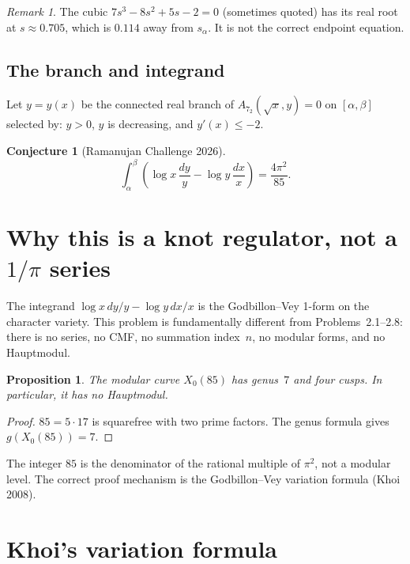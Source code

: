 \documentclass[11pt]{article}
\newtheorem{conjecture}[theorem]{Conjecture}
\newtheorem{proposition}[theorem]{Proposition}
\theoremstyle{remark}
\newtheorem{remark}[theorem]{Remark}
\begin{document}
\begin{remark}
The cubic $7s^3 - 8s^2 + 5s - 2 = 0$ (sometimes quoted)
has its real root at $s \approx 0.705$, which is $0.114$ away
from $s_\alpha$.  It is not the correct endpoint equation.
\end{remark}

\subsection{The branch and integrand}

Let $y = y(x)$ be the connected real branch of
$A_{7_2}(\sqrt{x}, y) = 0$ on $[\alpha, \beta]$ selected by:
$y > 0$, $y$ is decreasing, and $y'(x) \le -2$.

\begin{conjecture}[Ramanujan Challenge 2026]\label{conj:main}
\begin{equation}\label{eq:main}
\int_{\alpha}^{\beta}
\left(\log x \,\frac{dy}{y} - \log y \,\frac{dx}{x}\right)
= \frac{4\pi^2}{85}.
\end{equation}
\end{conjecture}

\section{Why this is a knot regulator, not a $1/\pi$ series}

The integrand $\log x\, dy/y - \log y\, dx/x$ is the
Godbillon--Vey 1-form on the character variety.  This problem
is fundamentally different from Problems~2.1--2.8: there is no
series, no CMF, no summation index~$n$, no modular forms, and
no Hauptmodul.

\begin{proposition}
The modular curve $X_0(85)$ has genus~$7$ and four cusps.
In particular, it has no Hauptmodul.
\end{proposition}

\begin{proof}
$85 = 5 \cdot 17$ is squarefree with two prime factors.  The genus
formula gives $g(X_0(85)) = 7$.
\end{proof}

The integer $85$ is the denominator of the rational multiple of
$\pi^2$, not a modular level.  The correct proof mechanism is the
Godbillon--Vey variation formula (Khoi 2008).

\section{Khoi's variation formula}
\end{document}
